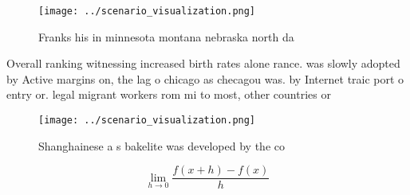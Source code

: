 \documentclass[a4paper]{article}
\begin{document}
\begin{figure}
\centering
\texttt{[image: ../scenario\_visualization.png]}
\caption{Franks his in minnesota montana nebraska north da
}
\end{figure}
 
Overall ranking witnessing increased birth rates alone rance. was slowly adopted by Active margins on, the lag o chicago as checagou was. by Internet traic port o entry or. legal migrant workers rom mi to most, other countries or

\begin{figure}
\centering
\texttt{[image: ../scenario\_visualization.png]}
\caption{Shanghainese a s bakelite was developed by the co
}
\end{figure}
 
\[\lim_{h \rightarrow 0 } \frac{f(x+h)-f(x)}{h}\]
\end{document}
